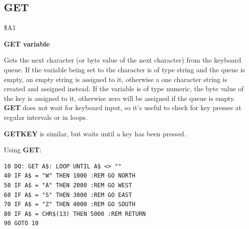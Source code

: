 \newpage
\subsection{GET}
\begin{description}[leftmargin=2cm,style=nextline]
\item [Token:] \$A1
\item [Format:] {\bf GET variable}
\item [Usage:] Gets the next character (or byte value of the next character)
               from the keyboard queue.
               If the variable being set to the character is of type string and the queue is empty,
               an empty string is assigned to it,
               otherwise a one character string is created
               and assigned instead.
               If the variable is of type numeric, the byte value
               of the key is assigned to it, otherwise zero will be assigned if the queue is empty.
               {\bf GET} does not wait for keyboard
               input, so it's useful to check for key presses
               at regular intervals or in loops.

\item [Remarks:] {\bf GETKEY} is similar, but waits
                 until a key has been pressed.

\item [Example:] Using {\bf GET}:
\begin{tcolorbox}[colback=black,coltext=white]
\verbatimfont{\codefont}
\begin{verbatim}
10 DO: GET A$: LOOP UNTIL A$ <> ""
40 IF A$ = "W" THEN 1000 :REM GO NORTH
50 IF A$ = "A" THEN 2000 :REM GO WEST
60 IF A$ = "S" THEN 3000 :REM GO EAST
70 IF A$ = "Z" THEN 4000 :REM GO SOUTH
80 IF A$ = CHR$(13) THEN 5000 :REM RETURN
90 GOTO 10
\end{verbatim}
\end{tcolorbox}
\end{description}


\newpage
